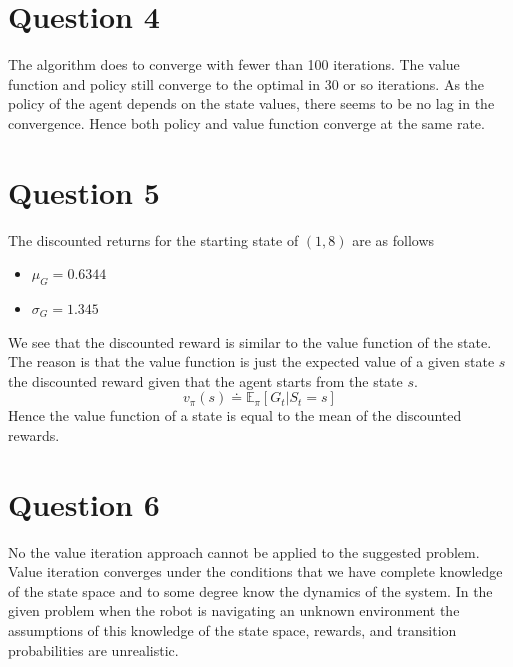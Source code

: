 \documentclass[a4paper]{article}
\begin{document}
\section{Question 4}
The algorithm does to converge with fewer than 100 iterations. The value function and policy still converge to the optimal in 30 or so iterations. As the policy of the agent depends on the state values, there seems to be no lag in the convergence. Hence both policy and value function converge at the same rate.
\section{Question 5}
The discounted returns for the starting state of $(1,8)$ are as follows 
\begin{itemize}
    \item $\mu_{G} = 0.6344$
    \item $\sigma_{G} = 1.345$
\end{itemize}
We see that the discounted reward is similar to the value function of the state. The reason is that the value function is just the expected value of a given state $s$ the discounted reward given that the agent starts from the state $s$. 
\[
v_{\pi}(s) \doteq \mathbb{E}_{\pi} \left [ G_{t} | S_{t}=s \right ]
\]
Hence the value function of a state is equal to the mean of the discounted rewards.
\section{Question 6}
No the value iteration approach cannot be applied to the suggested problem. Value iteration converges under the conditions that we have complete knowledge of the state space and to some degree know the dynamics of the system. In the given problem when the robot is navigating an unknown environment the assumptions of this knowledge of the state space, rewards, and transition probabilities are unrealistic.
\end{document}
